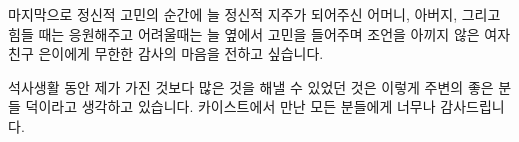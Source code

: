 \documentclass[master,english,final,pdfdoc]{kaist-ucs-improved}
\begin{document}
	마지막으로 정신적 고민의 순간에 늘 정신적 지주가 되어주신 어머니, 아버지, 그리고 힘들 때는 응원해주고 어려울때는 늘 옆에서 고민을 들어주며 조언을 아끼지 않은 여자친구 은이에게 무한한 감사의 마음을 전하고 싶습니다.

	
	석사생활 동안 제가 가진 것보다 많은 것을 해낼 수 있었던 것은 이렇게 주변의 좋은 분들 덕이라고 생각하고 있습니다.
	카이스트에서 만난 모든 분들에게 너무나 감사드립니다.
\fi


\iffinal
	
\fi

  \label{paperlastpagelabel}     %
\end{document}
